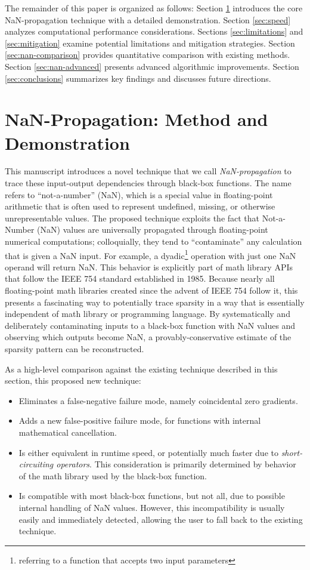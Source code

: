 \documentclass{article}
\begin{document}
The remainder of this paper is organized as follows: Section \ref{sec:nan-demo} introduces the core NaN-propagation technique with a detailed demonstration. Section \ref{sec:speed} analyzes computational performance considerations. Sections \ref{sec:limitations} and \ref{sec:mitigation} examine potential limitations and mitigation strategies. Section \ref{sec:nan-comparison} provides quantitative comparison with existing methods. Section \ref{sec:nan-advanced} presents advanced algorithmic improvements. Section \ref{sec:conclusions} summarizes key findings and discusses future directions.

\section{NaN-Propagation: Method and Demonstration}
\label{sec:nan-demo}

This manuscript introduces a novel technique that we call \emph{NaN-propagation} to trace these input-output dependencies through black-box functions. The name refers to ``not-a-number'' (NaN), which is a special value in floating-point arithmetic that is often used to represent undefined, missing, or otherwise unrepresentable values. The proposed technique exploits the fact that Not-a-Number (NaN) values are universally propagated through floating-point numerical computations; colloquially, they tend to ``contaminate'' any calculation that is given a NaN input. For example, a dyadic\footnote{referring to a function that accepts two input parameters} operation with just one NaN operand will return NaN. This behavior is explicitly part of math library APIs that follow the IEEE 754 standard established in 1985. Because nearly all floating-point math libraries created since the advent of IEEE 754 follow it, this presents a fascinating way to potentially trace sparsity in a way that is essentially independent of math library or programming language. By systematically and deliberately contaminating inputs to a black-box function with NaN values and observing which outputs become NaN, a provably-conservative estimate of the sparsity pattern can be reconstructed.

As a high-level comparison against the existing technique described in this section, this proposed new technique:

\begin{itemize}[noitemsep]
    \item Eliminates a false-negative failure mode, namely coincidental zero gradients.
    \item Adds a new false-positive failure mode, for functions with internal mathematical cancellation.
    \item Is either equivalent in runtime speed, or potentially much faster due to \emph{short-circuiting operators}. This consideration is primarily determined by behavior of the math library used by the black-box function.
    \item Is compatible with most black-box functions, but not all, due to possible internal handling of NaN values. However, this incompatibility is usually easily and immediately detected, allowing the user to fall back to the existing technique.
\end{itemize}
\end{document}
